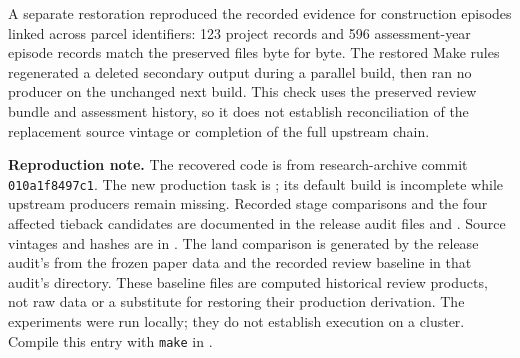 A separate restoration reproduced the recorded evidence for construction episodes
linked across parcel identifiers: 123 project records and 596 assessment-year
episode records match the preserved files byte for byte. The restored Make rules
regenerated a deleted secondary output during a parallel build, then ran no
producer on the unchanged next build. This check uses the preserved review bundle
and assessment history, so it does not establish reconciliation of the replacement
source vintage or completion of the full upstream chain.

\textbf{Reproduction note.}
The recovered code is from research-archive commit
\nolinkurl{010a1f8497c1}.
The new production task is ; its default
build is incomplete while upstream producers remain missing. Recorded stage
comparisons and the four affected tieback candidates are documented in
the release audit files  and
.
Source vintages and hashes are in .
The land comparison is generated by the release audit's
 from the frozen paper data and the
recorded review baseline in that audit's  directory. These
baseline files are computed historical review products, not raw data or a
substitute for restoring their production derivation.
The experiments were run locally; they do not establish execution on a cluster.
Compile this entry with \texttt{make} in .
\normalsize
